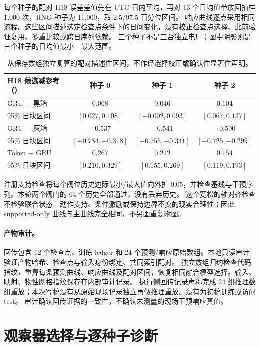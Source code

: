 每个种子的配对 H18 误差差值先在 UTC 日内平均，再对 13 个日均值带放回抽样 1,000 次，RNG 种子为 11,000，取 2.5/97.5 百分位区间。
响应曲线逐点采用相同流程。这些区间描述选定检查点条件下的日间变化，没有校正检查点选择、此前验证复用、多重比较或跨日序列依赖。
三个种子不是三台独立电厂；图中阴影则是三个种子的日均值最小—最大范围。

\begin{table}[!ht]
\centering\small
\begin{tabular}{lccc}
\toprule
H18 候选减参考（\degc{}） & 种子 0 & 种子 1 & 种子 2\\
\midrule
GRU $-$ 黑箱 & $0.068$ & $0.046$ & $0.104$\\
95\% 日块区间 & $[0.027,0.108]$ & $[-0.002,0.093]$ & $[0.067,0.137]$\\
GRU $-$ 灰箱 & $-0.537$ & $-0.541$ & $-0.500$\\
95\% 日块区间 & $[-0.784,-0.318]$ & $[-0.756,-0.341]$ & $[-0.725,-0.299]$\\
Token $-$ GRU & $0.267$ & $0.212$ & $0.154$\\
95\% 日块区间 & $[0.210,0.329]$ & $[0.155,0.269]$ & $[0.119,0.193]$\\
\bottomrule
\end{tabular}
\caption{从保存数组独立复算的配对描述性区间，不作经选择校正或确认性显著性声明。}
\end{table}

注册支持检查将每个阀位历史边际最小/最大值向外扩 0.05，并检查基线与干预序列。本轮两个阀门的 64 个历史全部通过，没有丢弃历史。
这个宽松的轴对齐检查不检验联合状态—动作支持、条件激励或保持边界不变的现实合理性；因此 supported-only 曲线与主曲线完全相同，不另画重复附图。

\paragraph{产物审计。}
回传包含 12 个检查点、训练 ledger 和 24 个预测/响应原始数组。本地只读审计验证产物哈希、检查点与输入身份绑定、共同索引配对。
独立数组归约检查代码指纹，重算每条预测曲线、响应曲线及配对区间，恢复相同融合模型选择。输入、映射、物性网格指纹保存在内部审计记录。
执行侧回传记录声称完成 24 组推理数组重放；本次写稿没有从原始现场记录独立再做推理重放。没有为初稿训练或访问 test。
审计确认回传证据的一致性，不确认未测量的现场干预响应真值。

\section{观察器选择与逐种子诊断}\label{app:ablation}

